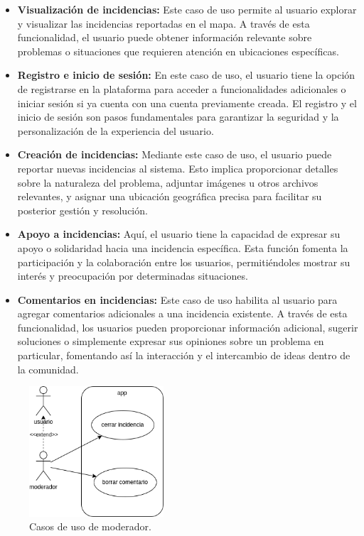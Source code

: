\documentclass{article}
\begin{document}
\begin{itemize}
    \item \textbf{Visualización de incidencias:} Este caso de uso permite al usuario explorar y visualizar las incidencias reportadas en el mapa. A través de esta funcionalidad, el usuario puede obtener información relevante sobre problemas o situaciones que requieren atención en ubicaciones específicas.

    \item \textbf{Registro e inicio de sesión:} En este caso de uso, el usuario tiene la opción de registrarse en la plataforma para acceder a funcionalidades adicionales o iniciar sesión si ya cuenta con una cuenta previamente creada. El registro y el inicio de sesión son pasos fundamentales para garantizar la seguridad y la personalización de la experiencia del usuario.
    
    \item \textbf{Creación de incidencias:} Mediante este caso de uso, el usuario puede reportar nuevas incidencias al sistema. Esto implica proporcionar detalles sobre la naturaleza del problema, adjuntar imágenes u otros archivos relevantes, y asignar una ubicación geográfica precisa para facilitar su posterior gestión y resolución.
    
    \item \textbf{Apoyo a incidencias:} Aquí, el usuario tiene la capacidad de expresar su apoyo o solidaridad hacia una incidencia específica. Esta función fomenta la participación y la colaboración entre los usuarios, permitiéndoles mostrar su interés y preocupación por determinadas situaciones.
    
    \item \textbf{Comentarios en incidencias:} Este caso de uso habilita al usuario para agregar comentarios adicionales a una incidencia existente. A través de esta funcionalidad, los usuarios pueden proporcionar información adicional, sugerir soluciones o simplemente expresar sus opiniones sobre un problema en particular, fomentando así la interacción y el intercambio de ideas dentro de la comunidad.
\end{itemize}

\begin{figure}[H]
    \center
    \includegraphics[width=5cm]{images/caso_de_uso_moderador.png}
    \caption{Casos de uso de moderador.}
    \label{fig:caso_uso_mod}
\end{figure}
\end{document}
